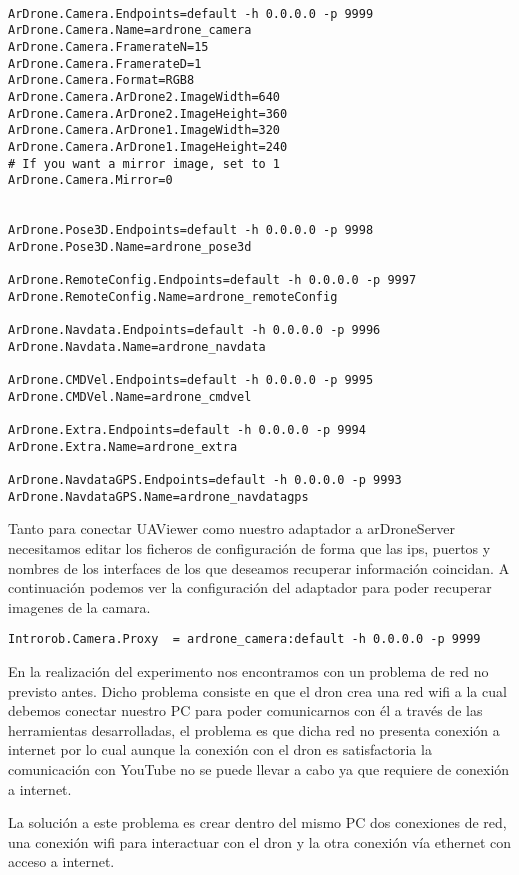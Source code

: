 \begin{lstlisting}

ArDrone.Camera.Endpoints=default -h 0.0.0.0 -p 9999
ArDrone.Camera.Name=ardrone_camera
ArDrone.Camera.FramerateN=15
ArDrone.Camera.FramerateD=1
ArDrone.Camera.Format=RGB8
ArDrone.Camera.ArDrone2.ImageWidth=640
ArDrone.Camera.ArDrone2.ImageHeight=360
ArDrone.Camera.ArDrone1.ImageWidth=320
ArDrone.Camera.ArDrone1.ImageHeight=240
# If you want a mirror image, set to 1
ArDrone.Camera.Mirror=0


ArDrone.Pose3D.Endpoints=default -h 0.0.0.0 -p 9998
ArDrone.Pose3D.Name=ardrone_pose3d

ArDrone.RemoteConfig.Endpoints=default -h 0.0.0.0 -p 9997
ArDrone.RemoteConfig.Name=ardrone_remoteConfig

ArDrone.Navdata.Endpoints=default -h 0.0.0.0 -p 9996
ArDrone.Navdata.Name=ardrone_navdata

ArDrone.CMDVel.Endpoints=default -h 0.0.0.0 -p 9995
ArDrone.CMDVel.Name=ardrone_cmdvel

ArDrone.Extra.Endpoints=default -h 0.0.0.0 -p 9994
ArDrone.Extra.Name=ardrone_extra

ArDrone.NavdataGPS.Endpoints=default -h 0.0.0.0 -p 9993
ArDrone.NavdataGPS.Name=ardrone_navdatagps

\end{lstlisting}

Tanto para conectar UAViewer como nuestro adaptador a arDroneServer necesitamos editar los ficheros de configuración de forma que las ips, puertos y nombres de los interfaces de los que deseamos recuperar información coincidan. A continuación podemos ver la configuración del adaptador para poder recuperar imagenes de la camara.

\begin{lstlisting}
Introrob.Camera.Proxy  = ardrone_camera:default -h 0.0.0.0 -p 9999
\end{lstlisting}

En la realización del experimento nos encontramos con un problema de red no previsto antes. Dicho problema consiste en que el dron crea una red wifi a la cual debemos conectar nuestro PC para poder comunicarnos con él a través de las herramientas desarrolladas, el problema es que dicha red no presenta conexión a internet por lo cual aunque la conexión con el dron es satisfactoria la comunicación con YouTube no se puede llevar a cabo ya que requiere de conexión a internet.

La solución a este problema es crear dentro del mismo PC dos conexiones de red, una conexión wifi para interactuar con el dron y la otra conexión vía ethernet con acceso a internet.

